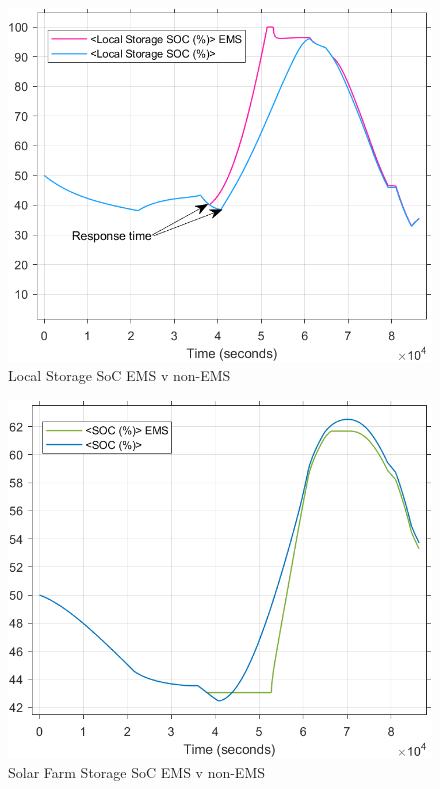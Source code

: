 \begin{figure}[H]
	\centering
	\includegraphics[totalheight=8cm]{Figures/local storage soc ems v non-ems.png}
	\caption{Local Storage SoC EMS v non-EMS}
\end{figure}
\begin{figure}[H]
	\centering
	\includegraphics[totalheight=8cm]{Figures/solar farm storage soc ems v non-ems.png}
	\caption{Solar Farm Storage SoC EMS v non-EMS}
\end{figure}

